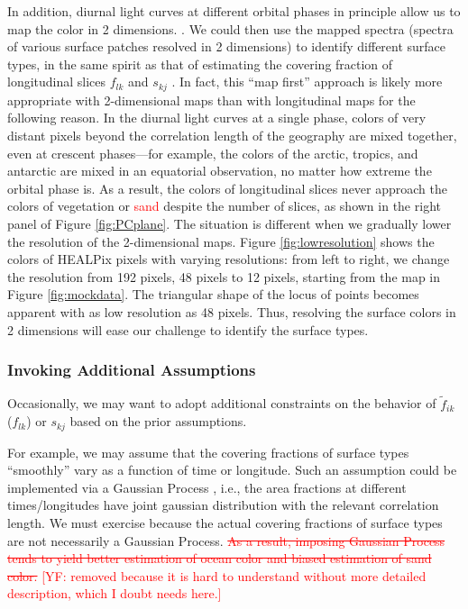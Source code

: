 \documentclass[iop,numberedappendix,apj]{emulateapj}
\def\fast{\tilde f}
\def\edit#1{\textcolor{red}{#1}}
\begin{document}
In addition, diurnal light curves at different orbital phases in principle allow us to map the color in 2 dimensions.   \citep{Kawahara2010,Kawahara2011,Fujii2012}. 
We could then use the mapped spectra (spectra of various surface patches resolved in 2 dimensions) to identify different surface types, in the same spirit as that of estimating the covering fraction of longitudinal slices $f_{lk}$ and $s_{kj}$ . 
In fact, this ``map first'' approach is likely more appropriate with 2-dimensional maps than with longitudinal maps for the following reason. 
In the diurnal light curves at a single phase, colors of very distant pixels beyond the correlation length of the geography are mixed together, even at crescent phases---for example, the colors of the arctic, tropics, and antarctic are mixed in an equatorial observation, no matter how extreme the orbital phase is. 
As a result, the colors of longitudinal slices never approach the colors of vegetation or \edit{sand} despite the number of slices, as shown in the right panel of Figure \ref{fig:PCplane}. 
The situation is different when we gradually lower the resolution of the 2-dimensional maps. 
Figure \ref{fig:lowresolution} shows the colors of HEALPix pixels \citep{Gorski2005} with varying resolutions: from left to right, we change the resolution from 192 pixels, 48 pixels to 12 pixels, starting from the map in Figure \ref{fig:mockdata}. 
The triangular shape of the locus of points becomes apparent with as low resolution as 48 pixels. 
Thus, resolving the surface colors in 2 dimensions will ease our challenge to identify the surface types. 



\subsubsection{Invoking Additional Assumptions}

Occasionally, we may want to adopt additional constraints on the behavior of $\fast _{ik}$ ($f_{lk}$) or $s_{kj}$ based on the prior assumptions. 

For example, we may assume that the covering fractions of surface types  ``smoothly'' vary as a function of time or longitude. 
Such an assumption could be implemented via a Gaussian Process \citep[e.g.,][]{Rasmussen2005}, i.e., the area fractions at different times/longitudes have joint gaussian distribution with the relevant correlation length. 
We must exercise because the actual covering fractions of surface types are not necessarily a Gaussian Process. 
\edit{\sout{As a result, imposing Gaussian Process tends to yield better estimation of ocean color and biased estimation of \edit{sand} color. }[YF: removed because it is hard to understand without more detailed description, which I doubt needs here.]}
\end{document}
